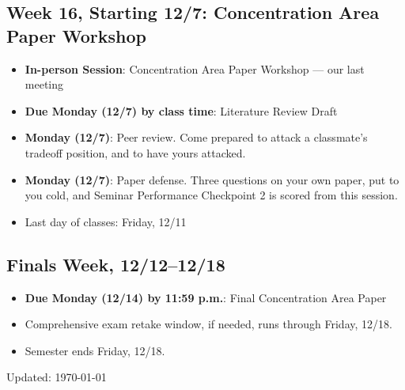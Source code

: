 \documentclass[11pt]{article}     %
\begin{document}
\subsection*{Week 16, Starting 12/7: Concentration Area Paper Workshop}
\begin{itemize}
    \item \textbf{In-person Session}: Concentration Area Paper Workshop --- our last meeting
    \item \textbf{Due Monday (12/7) by class time}: Literature Review Draft
    \item \textbf{Monday (12/7)}: Peer review. Come prepared to attack a classmate's tradeoff position, and to have yours attacked.
    \item \textbf{Monday (12/7)}: Paper defense. Three questions on your own paper, put to you cold, and Seminar Performance Checkpoint 2 is scored from this session.
    \item Last day of classes: Friday, 12/11
\end{itemize}

\subsection*{Finals Week, 12/12--12/18}
\begin{itemize}
    \item \textbf{Due Monday (12/14) by 11:59 p.m.}: Final Concentration Area Paper
    \item Comprehensive exam retake window, if needed, runs through Friday, 12/18.
    \item Semester ends Friday, 12/18.
\end{itemize}


\newpage

\singlespace


\vspace{1cm}
\begin{flushright}
Updated: \today
\end{flushright}
\end{document}
